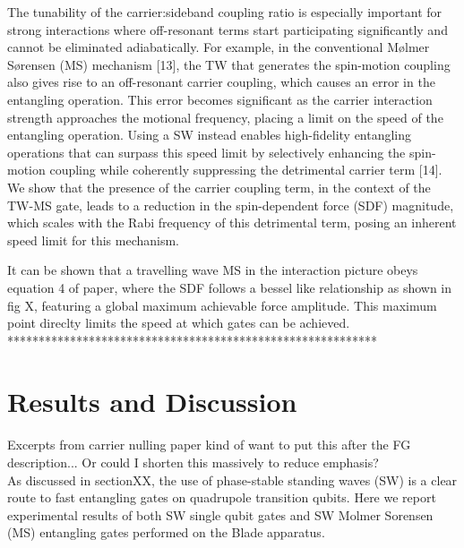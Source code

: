 \documentclass[12pt]{iopart}
\begin{document}
    The tunability of the carrier:sideband coupling ratio is especially
    important for strong interactions where off-resonant terms start
    participating significantly and cannot be eliminated
    adiabatically. For example, in the conventional Mølmer Sørensen (MS)
    mechanism [13], the TW that generates the spin-motion coupling also
    gives rise to an off-resonant carrier coupling, which causes an error
    in the entangling operation. This error becomes significant as the
    carrier interaction strength approaches the motional frequency,
    placing a limit on the speed of the entangling operation. Using a SW
    instead enables high-fidelity entangling operations that can surpass
    this speed limit by selectively enhancing the spin-motion coupling
    while coherently suppressing the detrimental carrier term [14].\\


    We show that the
    presence of the carrier coupling term, in the context of the TW-MS
    gate, leads to a reduction in the spin-dependent force (SDF)
    magnitude, which scales with the Rabi frequency of this detrimental
    term, posing an inherent speed limit for this mechanism.

    It can be shown that a travelling wave MS in the interaction picture obeys
    equation 4 of paper, where the SDF follows a bessel like
    relationship as shown in fig X, featuring a global maximum
    achievable force amplitude. This maximum point direclty limits the
    speed at which gates can be achieved.\\
    ***********************************************************\\

\section{Results and Discussion}

    Excerpts from carrier nulling paper kind of want to put this after the FG description... Or could I shorten this massively to reduce emphasis?\\
    
    As discussed in sectionXX, the use of phase-stable standing waves (SW) is a clear route to fast entangling gates on quadrupole transition qubits. 
    Here we report experimental results of both SW single qubit gates and SW Molmer Sorensen (MS) entangling gates performed on the Blade apparatus.\\
\end{document}
